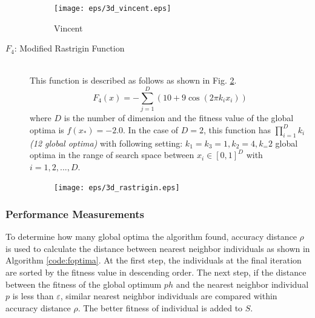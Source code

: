 \documentclass[conference]{IEEEtran}
\begin{document}
\begin{description}
\begin{figure}[h]
\begin{center}
	\texttt{[image: eps/3d\_vincent.eps]}
\caption{Vincent}
\label{fig:f3}
\end{center}
\end{figure}

\item[$F_4$: Modified Rastrigin Function]\mbox{}\\
 This function is described as follows as shown in Fig. \ref{fig:f4}.
 \begin{equation}
F_4(x) = -\sum_{j=1}^D (10+9 \cos(2 \pi k_i x_i)) 
\end{equation}
where $D$ is the number of dimension and the fitness value of the global optima is ${f(x_*)=-2.0}$. In the case of $D=2$, this function has $\prod_{i=1}^D k_i$ \textit{(12 global optima)} with following setting: $k_1=k_3=1, k_2=4, k_=2$  global optima in the range of search space between $x_i \in [0, 1]^D$ with $i=1,2,...,D$.

\begin{figure}[h]
\begin{center}
	\texttt{[image: eps/3d\_rastrigin.eps]}
\label{fig:f4}
\end{center}
\end{figure}

\end{description}

\subsubsection{Performance Measurements}
To determine how many global optima the algorithm found, accuracy distance $\rho$ is used to calculate the distance between nearest neighbor individuals as shown in Algorithm \ref{code:foptima}. At the first step, the individuals at the final iteration are sorted by the fitness value in descending order. The next step, if the distance between the fitness of the global optimum $ph$ and the nearest neighbor individual $p$ is less than $\varepsilon$, similar nearest neighbor individuals are compared within accuracy distance $\rho$. The better fitness of individual is added to $S$.
\end{document}
